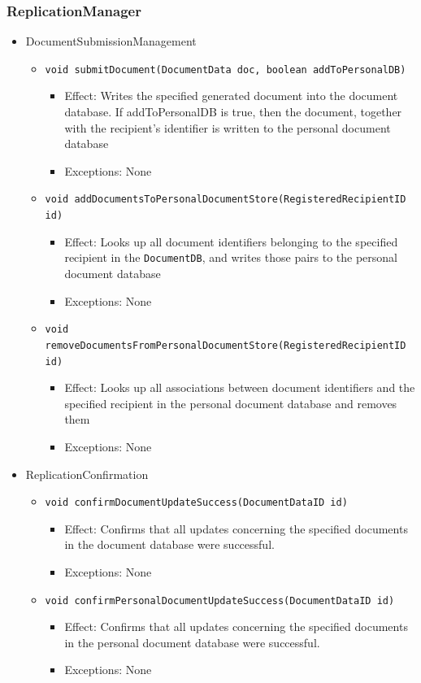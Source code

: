 \documentclass[a4paper,10pt]{article}
\begin{document}
\subsubsection*{ReplicationManager}
\begin{itemize}
	\item DocumentSubmissionManagement
	\begin{itemize}
		\item \texttt{void submitDocument(DocumentData doc, boolean addToPersonalDB)}
		\begin{itemize}
			\item Effect: Writes the specified generated document into the document database. If addToPersonalDB is true, then the document, together with the recipient's identifier is written to the personal document database
			\item Exceptions: None
		\end{itemize}

		\item \texttt{void addDocumentsToPersonalDocumentStore(RegisteredRecipientID id)}
		\begin{itemize}
			\item Effect: Looks up all document identifiers belonging to the specified recipient in the \texttt{DocumentDB}, and writes those pairs to the personal document database
			\item Exceptions: None
		\end{itemize}

		\item \texttt{void removeDocumentsFromPersonalDocumentStore(RegisteredRecipientID id)}
		\begin{itemize}
			\item Effect: Looks up all associations between document identifiers and the specified recipient in the personal document database and removes them
			\item Exceptions: None
		\end{itemize}
	\end{itemize}

	\item ReplicationConfirmation
	\begin{itemize}
		\item \texttt{void confirmDocumentUpdateSuccess(DocumentDataID id)}
		\begin{itemize}
			\item Effect: Confirms that all updates concerning the specified documents in the document database were successful.
			\item Exceptions: None
		\end{itemize}

		\item \texttt{void confirmPersonalDocumentUpdateSuccess(DocumentDataID id)}
		\begin{itemize}
			\item Effect: Confirms that all updates concerning the specified documents in the personal document database were successful.
			\item Exceptions: None
		\end{itemize}
	\end{itemize}
\end{itemize}
\end{document}

